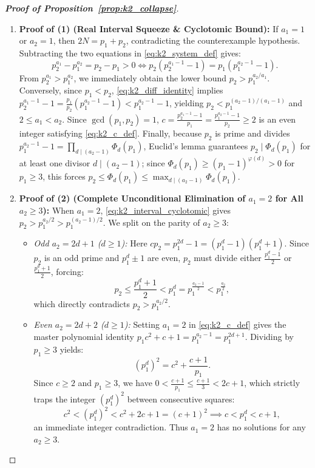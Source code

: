 \documentclass[11pt,a4paper]{article}
\theoremstyle{definition}
\begin{document}
\begin{proof}[\textbf{Proof of Proposition~\ref{prop:k2_collapse}}]
\begin{enumerate}
    \item \textbf{Proof of (1) (Real Interval Squeeze \& Cyclotomic Bound):}  
    If $a_1 = 1$ or $a_2 = 1$, then $2N = p_1 + p_2$, contradicting the counterexample hypothesis. Subtracting the two equations in \eqref{eq:k2_system_def} gives:
    \begin{equation}
    \label{eq:k2_diff_identity}
    p_2^{a_1} - p_1^{a_2} = p_2 - p_1 > 0 \iff p_2(p_2^{a_1 - 1} - 1) = p_1(p_1^{a_2 - 1} - 1).
    \end{equation}
    From $p_2^{a_1} > p_1^{a_2}$, we immediately obtain the lower bound $p_2 > p_1^{a_2 / a_1}$. Conversely, since $p_1 < p_2$, \eqref{eq:k2_diff_identity} implies $p_2^{a_1 - 1} - 1 = \frac{p_1}{p_2}(p_1^{a_2 - 1} - 1) < p_1^{a_2 - 1} - 1$, yielding $p_2 < p_1^{(a_2 - 1)/(a_1 - 1)}$ and $2 \le a_1 < a_2$. Since $\gcd(p_1, p_2) = 1$, $c = \frac{p_2^{a_1 - 1} - 1}{p_1} = \frac{p_1^{a_2 - 1} - 1}{p_2} \ge 2$ is an even integer satisfying \eqref{eq:k2_c_def}. Finally, because $p_2$ is prime and divides $p_1^{a_2 - 1} - 1 = \prod_{d \mid (a_2 - 1)} \Phi_d(p_1)$, Euclid's lemma guarantees $p_2 \mid \Phi_d(p_1)$ for at least one divisor $d \mid (a_2 - 1)$; since $\Phi_d(p_1) \ge (p_1 - 1)^{\varphi(d)} > 0$ for $p_1 \ge 3$, this forces $p_2 \le \Phi_d(p_1) \le \max_{d \mid (a_2 - 1)} \Phi_d(p_1)$.

    \item \textbf{Proof of (2) (Complete Unconditional Elimination of $a_1 = 2$ for All $a_2 \ge 3$):}  
    When $a_1 = 2$, \eqref{eq:k2_interval_cyclotomic} gives $p_2 > p_1^{a_2 / 2} > p_1^{(a_2 - 1)/2}$. We split on the parity of $a_2 \ge 3$:
    \begin{itemize}
        \item \emph{Odd $a_2 = 2d + 1$ ($d \ge 1$):} Here $c p_2 = p_1^{2d} - 1 = (p_1^d - 1)(p_1^d + 1)$. Since $p_2$ is an odd prime and $p_1^d \pm 1$ are even, $p_2$ must divide either $\frac{p_1^d - 1}{2}$ or $\frac{p_1^d + 1}{2}$, forcing:
        \[
        p_2 \le \frac{p_1^d + 1}{2} < p_1^d = p_1^{\frac{a_2 - 1}{2}} < p_1^{\frac{a_2}{2}},
        \]
        which directly contradicts $p_2 > p_1^{a_2 / 2}$.
        \item \emph{Even $a_2 = 2d + 2$ ($d \ge 1$):} Setting $a_1 = 2$ in \eqref{eq:k2_c_def} gives the master polynomial identity $p_1 c^2 + c + 1 = p_1^{a_2 - 1} = p_1^{2d + 1}$. Dividing by $p_1 \ge 3$ yields:
        \[
        (p_1^d)^2 = c^2 + \frac{c + 1}{p_1}.
        \]
        Since $c \ge 2$ and $p_1 \ge 3$, we have $0 < \frac{c + 1}{p_1} \le \frac{c + 1}{3} < 2c + 1$, which strictly traps the integer $(p_1^d)^2$ between consecutive squares:
        \[
        c^2 < (p_1^d)^2 < c^2 + 2c + 1 = (c + 1)^2 \implies c < p_1^d < c + 1,
        \]
        an immediate integer contradiction. Thus $a_1 = 2$ has no solutions for any $a_2 \ge 3$.
    \end{itemize}


\end{enumerate}
\end{proof}
\end{document}
